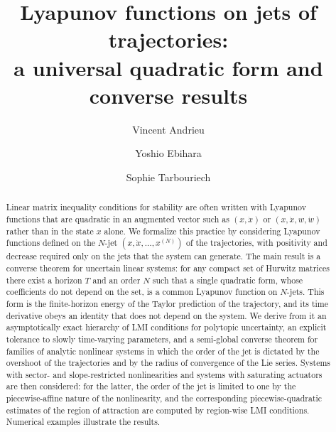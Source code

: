 \documentclass[preprint,12pt,authoryear]{elsarticle}
\theoremstyle{definition}
\theoremstyle{remark}
\begin{document}
\begin{frontmatter}

\title{Lyapunov functions on jets of trajectories:\\ a universal quadratic form and converse results}

\author[lyon]{Vincent Andrieu}
\author[kyushu]{Yoshio Ebihara}
\author[laas]{Sophie Tarbouriech}

\address[lyon]{Universit\'e Claude Bernard Lyon 1, CNRS, LAGEPP UMR 5007, 69100 Villeurbanne, France}
\address[kyushu]{Faculty of Information Science and Electrical Engineering, Kyushu University, Fukuoka 819-0395, Japan} %
\address[laas]{LAAS-CNRS, Universit\'e de Toulouse, CNRS, 31400 Toulouse, France}

\begin{abstract}
Linear matrix inequality conditions for stability are often written with Lyapunov functions that are quadratic in an augmented vector such as $(x,\dot x)$ or $(x,\dot x,w,\dot w)$ rather than in the state $x$ alone. We formalize this practice by considering Lyapunov functions defined on the $N$-jet $(x,\dot x,\dots,x^{(N)})$ of the trajectories, with positivity and decrease required only on the jets that the system can generate. The main result is a converse theorem for uncertain linear systems: for any compact set of Hurwitz matrices there exist a horizon $T$ and an order $N$ such that a single quadratic form, whose coefficients do not depend on the set, is a common Lyapunov function on $N$-jets. This form is the finite-horizon energy of the Taylor prediction of the trajectory, and its time derivative obeys an identity that does not depend on the system. We derive from it an asymptotically exact hierarchy of LMI conditions for polytopic uncertainty, an explicit tolerance to slowly time-varying parameters, and a semi-global converse theorem for families of analytic nonlinear systems in which the order of the jet is dictated by the overshoot of the trajectories and by the radius of convergence of the Lie series. Systems with sector- and slope-restricted nonlinearities and systems with saturating actuators are then considered: for the latter, the order of the jet is limited to one by the piecewise-affine nature of the nonlinearity, and the corresponding piecewise-quadratic estimates of the region of attraction are computed by region-wise LMI conditions. Numerical examples illustrate the results.
\end{abstract}


\end{frontmatter}
\end{document}
